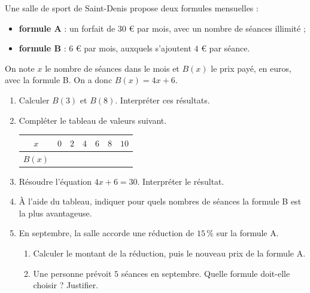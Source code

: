 \documentclass[10pt,a4paper]{article}
\begin{document}
\begin{bloc}
\begin{exo}
Une salle de sport de Saint-Denis propose deux formules mensuelles :
\begin{itemize}
    \item \textbf{formule A} : un forfait de \(30\) \euro{} par mois, avec un nombre de séances illimité ;
    \item \textbf{formule B} : \(6\) \euro{} par mois, auxquels s'ajoutent \(4\) \euro{} par séance.
\end{itemize}
On note \(x\) le nombre de séances dans le mois et \(B(x)\) le prix payé, en euros, avec la formule B. On a donc \(B(x)=4x+6\).
\begin{enumerate}[leftmargin=*]
    \item Calculer \(B(3)\) et \(B(8)\). Interpréter ces résultats.
    \item Compléter le tableau de valeurs suivant.

    \begin{center}
    \renewcommand{\arraystretch}{1.5}
    \begin{tabular}{|*{7}{c|}}
        \hline
        \(x\) & \(0\) & \(2\) & \(4\) & \(6\) & \(8\) & \(10\) \\ \hline
        \(B(x)\) & & & & & & \\ \hline
    \end{tabular}
    \end{center}
    \item Résoudre l'équation \(4x+6=30\). Interpréter le résultat.
    \item À l'aide du tableau, indiquer pour quels nombres de séances la formule B est la plus avantageuse.
    \item En septembre, la salle accorde une réduction de \(15\,\%\) sur la formule A.
    \begin{enumerate}
        \item Calculer le montant de la réduction, puis le nouveau prix de la formule A.
        \item Une personne prévoit \(5\) séances en septembre. Quelle formule doit-elle choisir ? Justifier.
    \end{enumerate}
\end{enumerate}
\end{exo}
\end{bloc}

\end{document}

